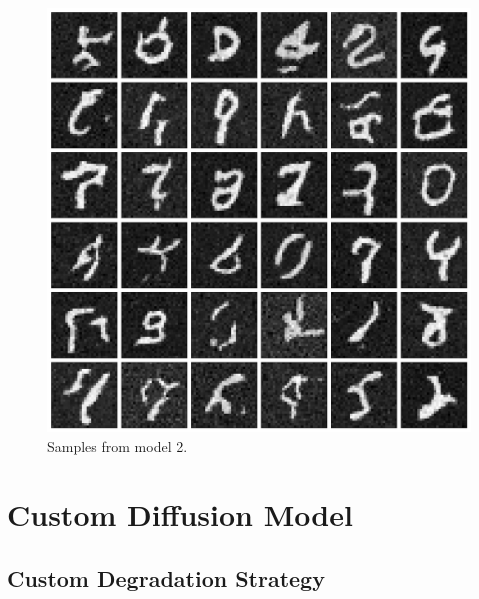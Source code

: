 \documentclass[12pt]{article}
\begin{document}
\begin{figure}[hp]
    \includegraphics[scale=0.3, center]{figures/samples_2.png}
    \caption{Samples from model 2.}
    \label{fig:samples_2}
\end{figure}

\section{Custom Diffusion Model}


\subsection{Custom Degradation Strategy}
\end{document}
